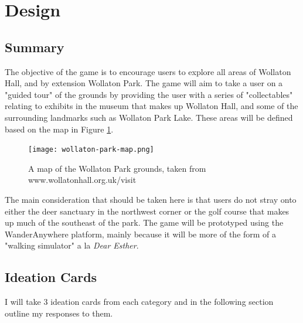 \documentclass[12pt, a4paper]{article}
\begin{document}
\maketitle

\section{Design}
\subsection{Summary}
The objective of the game is to encourage users to explore all areas of Wollaton Hall, and by extension Wollaton Park.
The game will aim to take a user on a "guided tour" of the grounds by providing the user with a series of "collectables" relating to exhibits in the museum that makes up Wollaton Hall, and some of the surrounding landmarks such as Wollaton Park Lake.
These areas will be defined based on the map in Figure \ref{fig:wollatonmap}.

\begin{figure}[ht]
  \centering
  \caption{A map of the Wollaton Park grounds, taken from www.wollatonhall.org.uk/visit}
  \texttt{[image: wollaton-park-map.png]}
  \label{fig:wollatonmap}
\end{figure}

The main consideration that should be taken here is that users do not stray onto either the deer sanctuary in the northwest corner or the golf course that makes up much of the southeast of the park.
The game will be prototyped using the WanderAnywhere platform, mainly because it will be more of the form of a "walking simulator" a la \textit{Dear Esther}.

\subsection{Ideation Cards}
I will take 3 ideation cards from each category and in the following section outline my responses to them.
\end{document}
